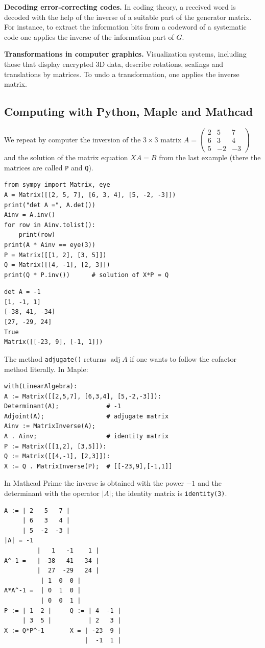 \textbf{Decoding error-correcting codes.}
In coding theory, a received word is decoded with the help of the inverse of
a suitable part of the generator matrix. For instance, to extract the
information bits from a codeword of a systematic code one applies the
inverse of the information part of $G$.

\textbf{Transformations in computer graphics.}
Visualization systems, including those that display encrypted 3D data,
describe rotations, scalings and translations by matrices. To undo a
transformation, one applies the inverse matrix.

\subsection{Computing with Python, Maple and Mathcad}
We repeat by computer the inversion of the $3\times 3$ matrix
$A=\begin{pmatrix}2 & 5 & 7\\ 6 & 3 & 4\\ 5 & -2 & -3\end{pmatrix}$ and the
solution of the matrix equation $XA=B$ from the last example (there the
matrices are called \texttt{P} and \texttt{Q}).
\begin{Verbatim}[fontsize=\footnotesize,frame=single,label={\small Python}]
from sympy import Matrix, eye
A = Matrix([[2, 5, 7], [6, 3, 4], [5, -2, -3]])
print("det A =", A.det())
Ainv = A.inv()
for row in Ainv.tolist():
    print(row)
print(A * Ainv == eye(3))
P = Matrix([[1, 2], [3, 5]])
Q = Matrix([[4, -1], [2, 3]])
print(Q * P.inv())      # solution of X*P = Q
\end{Verbatim}
\begin{Verbatim}[fontsize=\footnotesize,frame=single,label={\small Output}]
det A = -1
[1, -1, 1]
[-38, 41, -34]
[27, -29, 24]
True
Matrix([[-23, 9], [-1, 1]])
\end{Verbatim}
The method \texttt{adjugate()} returns $\operatorname{adj}A$ if one wants to
follow the cofactor method literally. In Maple:
\begin{Verbatim}[fontsize=\footnotesize,frame=single,label={\small Maple}]
with(LinearAlgebra):
A := Matrix([[2,5,7], [6,3,4], [5,-2,-3]]):
Determinant(A);             # -1
Adjoint(A);                 # adjugate matrix
Ainv := MatrixInverse(A);
A . Ainv;                   # identity matrix
P := Matrix([[1,2], [3,5]]):
Q := Matrix([[4,-1], [2,3]]):
X := Q . MatrixInverse(P);  # [[-23,9],[-1,1]]
\end{Verbatim}
In Mathcad Prime the inverse is obtained with the power $-1$ and the
determinant with the operator $|A|$; the identity matrix is
\texttt{identity(3)}.
\begin{Verbatim}[fontsize=\footnotesize,frame=single,label={\small Mathcad}]
A := | 2   5   7 |
     | 6   3   4 |
     | 5  -2  -3 |
|A| = -1
         |   1   -1    1 |
A^-1 =   | -38   41  -34 |
         |  27  -29   24 |
          | 1  0  0 |
A*A^-1 =  | 0  1  0 |
          | 0  0  1 |
P := | 1  2 |     Q := | 4  -1 |
     | 3  5 |          | 2   3 |
X := Q*P^-1       X = | -23  9 |
                      |  -1  1 |
\end{Verbatim}

